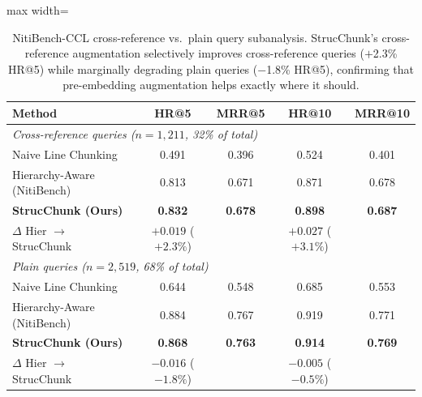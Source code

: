 \documentclass[sn-mathphys,Numbered]{sn-jnl}%
\begin{document}
\begin{table}[htbp]
\centering
\begin{adjustbox}{max width=\textwidth}
\begin{tabular}{lcccc}
\toprule
\textbf{Method} & \textbf{HR@5} & \textbf{MRR@5}
               & \textbf{HR@10} & \textbf{MRR@10} \\
\midrule
\multicolumn{5}{l}{\textit{Cross-reference queries ($n = 1{,}211$, 32\% of total)}} \\
Naive Line Chunking         & 0.491 & 0.396 & 0.524 & 0.401 \\
Hierarchy-Aware (NitiBench) & 0.813 & 0.671 & 0.871 & 0.678 \\
\textbf{StrucChunk (Ours)}  & \textbf{0.832} & \textbf{0.678}
                            & \textbf{0.898} & \textbf{0.687} \\
\midrule
$\Delta$ Hier $\to$ StrucChunk & $+0.019$ ($+2.3\%$) & & $+0.027$ ($+3.1\%$) & \\
\midrule
\multicolumn{5}{l}{\textit{Plain queries ($n = 2{,}519$, 68\% of total)}} \\
Naive Line Chunking         & 0.644 & 0.548 & 0.685 & 0.553 \\
Hierarchy-Aware (NitiBench) & 0.884 & 0.767 & 0.919 & 0.771 \\
\textbf{StrucChunk (Ours)}  & \textbf{0.868} & \textbf{0.763}
                            & \textbf{0.914} & \textbf{0.769} \\
\midrule
$\Delta$ Hier $\to$ StrucChunk & $-0.016$ ($-1.8\%$) & & $-0.005$ ($-0.5\%$) & \\
\bottomrule
\end{tabular}
\end{adjustbox}
\caption{NitiBench-CCL cross-reference vs.\ plain query subanalysis.
  StrucChunk's cross-reference augmentation selectively improves
  cross-reference queries ($+$2.3\% HR@5) while marginally degrading plain
  queries ($-$1.8\% HR@5), confirming that pre-embedding augmentation helps
  exactly where it should.}
\label{tab:niti_xref}
\end{table}
\end{document}
